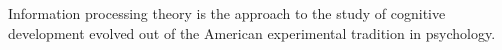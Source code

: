 \documentclass[a4paper]{article}
\title{}
\date{}
\begin{document}
    \maketitle
    Information processing theory is the approach to the study of cognitive development evolved out of the American experimental tradition in psychology.
\end{document}
